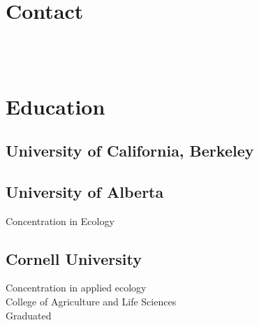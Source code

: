 \documentclass[]{deedy-resume-openfont}
\begin{document}
\begin{minipage}[t]{0.32\textwidth} 

\section{Contact} 
\href{mailto:dana.seidel@gmail.com}{} \\
 \hspace{2pt} 
\href{https://twitter.com/dpseidel}{} \\
\href{https://github.com/dpseidel}{} \hspace{2pt}
\href{https://www.linkedin.com/in/dana-seidel/}{} 
\sectionsep

\section{Education} 
\subsection{University of California, Berkeley}
\sectionsep

\subsection{University of Alberta}
Concentration in Ecology \\
\sectionsep

\subsection{Cornell University}
Concentration in applied ecology \\
College of Agriculture and Life Sciences \\
Graduated 
\sectionsep


\end{minipage}
\end{document}
